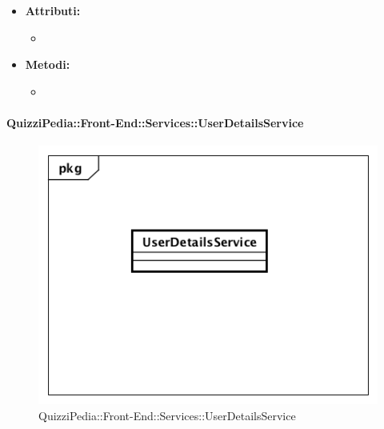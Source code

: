 \begin{itemize}
\begin{itemize}
	\end{itemize}
	\item \textbf{Attributi:}
	\begin{itemize}
		\item 
	\end{itemize}
	\item \textbf{Metodi:}
	\begin{itemize}
		\item 
	\end{itemize}
\end{itemize}

\paragraph{QuizziPedia::Front-End::Services::UserDetailsService}
\begin{figure}
	\centering
	\includegraphics[scale=0.45]{UML/Classi/Front-End/QuizziPedia_Front-end_Services_UserDetailsService.png}
	\caption{QuizziPedia::Front-End::Services::UserDetailsService}
\end{figure}
